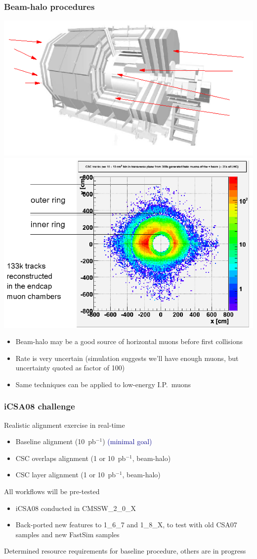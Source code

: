 \documentclass[compress]{beamer}
\begin{document}
\begin{frame}
\frametitle{Beam-halo procedures}

\vspace{-0.5 cm}
\begin{center}
\includegraphics[height=3 cm]{beam-halo_schematic.png} \includegraphics[height=4 cm]{beam-halo.png}
\end{center}

\begin{itemize}
\item Beam-halo may be a good source of horizontal muons before first collisions
\item Rate is very uncertain (simulation suggests we'll have enough
muons, but uncertainty quoted as factor of 100)
\item Same techniques can be applied to low-energy I.P.\ muons
\end{itemize}

\end{frame}

\begin{frame}
\frametitle{iCSA08 challenge}

Realistic alignment exercise in real-time

\begin{itemize}\setlength{\itemsep}{0.2 cm}
\item Baseline alignment (10~pb$^{-1}$) \textcolor{darkblue}{(minimal goal)}
\item CSC overlaps alignment (1 or 10~pb$^{-1}$, beam-halo)
\item CSC layer alignment (1 or 10~pb$^{-1}$, beam-halo)
\end{itemize}

\vfill All workflows will be pre-tested

\begin{itemize}\setlength{\itemsep}{0.2 cm}
\item iCSA08 conducted in CMSSW\_2\_0\_X
\item Back-ported new features to 1\_6\_7 and 1\_8\_X, to test with old CSA07 samples and new FastSim samples
\end{itemize}

\vfill Determined resource requirements for baseline procedure, others are in progress
\end{frame}
\end{document}
